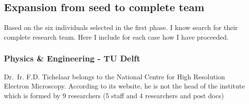 \documentclass[]{article}
\begin{document}
\subsection{Expansion from seed to complete
team}\label{expansion-from-seed-to-complete-team}

Based on the six individuals selected in the first phase. I know search
for their complete research team. Here I include for each case how I
have proceeded.

\subsubsection{Physics \& Engineering - TU
Delft}\label{physics-engineering---tu-delft}

Dr.~Ir. F.D. Tichelaar belongs to the National Centre for High
Resolution Electron Microscopy. According to its website, he is not the
head of the institute which is formed by 9 researchers (5 staff and 4
researchers and post docs)
\end{document}
